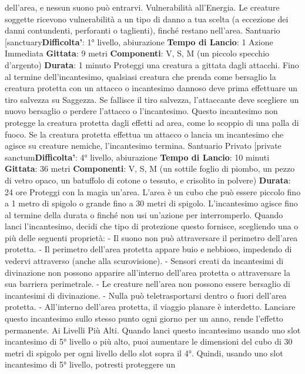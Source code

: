 \begin{multicols}{2}
dell’area, e nessun suono può entrarvi.
Vulnerabilità all’Energia. Le creature soggette
ricevono vulnerabilità a un tipo di danno a tua scelta (a
eccezione dei danni contundenti, perforanti o taglienti),
finché restano nell’area.
Santuario
[sanctuary\textbf{Difficolta'}:
1° livello, abiurazione
\textbf{Tempo di Lancio}: 1 Azione Immediata
\textbf{Gittata}: 9 metri
\textbf{Componenti}: V, S, M (un piccolo specchio d’argento)
\textbf{Durata}: 1 minuto
Proteggi una creatura a gittata dagli attacchi. Fino al
termine dell’incantesimo, qualsiasi creatura che prenda
come bersaglio la creatura protetta con un attacco o
incantesimo dannoso deve prima effettuare un tiro
salvezza su Saggezza. Se fallisce il tiro salvezza,
l’attaccante deve scegliere un nuovo bersaglio o
perdere l’attacco o l’incantesimo. Questo incantesimo
non protegge la creatura protetta dagli effetti ad area,
come lo scoppio di una palla di fuoco.
Se la creatura protetta effettua un attacco o lancia un
incantesimo che agisce su creature nemiche,
l’incantesimo termina.
Santuario Privato
[private sanctum\textbf{Difficolta'}:
4° livello, abiurazione
\textbf{Tempo di Lancio}: 10 minuti
\textbf{Gittata}: 36 metri
\textbf{Componenti}: V, S, M (un sottile foglio di piombo, un
pezzo di vetro opaco, un batuffolo di cotone o tessuto, e
crisolito in polvere)
\textbf{Durata}: 24 ore
Proteggi con la magia un’area. L’area è un cubo che
può essere piccolo fino a 1 metro di spigolo o grande
fino a 30 metri di spigolo. L’incantesimo agisce fino al
termine della durata o finché non usi un’azione per
interromperlo.
Quando lanci l’incantesimo, decidi che tipo di
protezione questo fornisce, scegliendo una o più delle
seguenti proprietà:
- Il suono non può attraversare il perimetro dell’area
protetta.
- Il perimetro dell’area protetta appare buio e
nebbioso, impedendo di vedervi attraverso (anche
alla scurovisione).
- Sensori creati da incantesimi di divinazione non
possono apparire all’interno dell’area protetta o
attraversare la sua barriera perimetrale.
- Le creature nell’area non possono essere bersaglio
di incantesimi di divinazione.
- Nulla può teletrasportarsi dentro o fuori dell’area
protetta.
- All’interno dell’area protetta, il viaggio planare è
interdetto.
Lanciare questo incantesimo sullo stesso punto ogni
giorno per un anno, rende l’effetto permanente.
Ai Livelli Più Alti. Quando lanci questo incantesimo
usando uno slot incantesimo di 5° livello o più alto, puoi
aumentare le dimensioni del cubo di 30 metri di spigolo
per ogni livello dello slot sopra il 4°. Quindi, usando uno
slot incantesimo di 5° livello, potresti proteggere un

\end{multicols}

